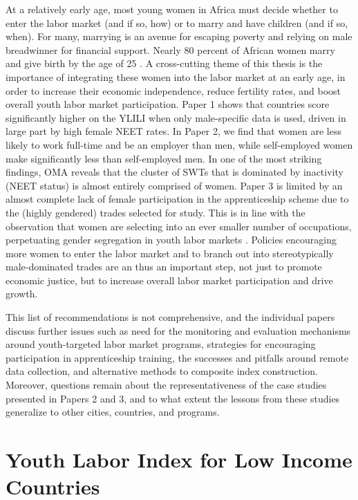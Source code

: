 \documentclass[
  a4paper, twoside, 12pt]{book}
\newcommand{\newsection}{\setcounter{figure}{0}
\renewcommand{\thefigure}{\arabic{chapter}.\arabic{figure}}
\setcounter{table}{0}
\renewcommand{\thetable}{\arabic{chapter}.\arabic{table}}}
\begin{document}
At a relatively early age, most young women in Africa must decide whether to enter the labor market (and if so, how) or to marry and have children (and if so, when). For many, marrying is an avenue for escaping poverty and relying on male breadwinner for financial support. Nearly 80 percent of African women marry and give birth by the age of 25 \autocite{filmer2014}. A cross-cutting theme of this thesis is the importance of integrating these women into the labor market at an early age, in order to increase their economic independence, reduce fertility rates, and boost overall youth labor market participation. Paper 1 shows that countries score significantly higher on the YLILI when only male-specific data is used, driven in large part by high female NEET rates. In Paper 2, we find that women are less likely to work full-time and be an employer than men, while self-employed women make significantly less than self-employed men. In one of the most striking findings, OMA reveals that the cluster of SWTs that is dominated by inactivity (NEET status) is almost entirely comprised of women. Paper 3 is limited by an almost complete lack of female participation in the apprenticeship scheme due to the (highly gendered) trades selected for study. This is in line with the observation that women are selecting into an ever smaller number of occupations, perpetuating gender segregation in youth labor markets \autocite{borrowman2020}. Policies encouraging more women to enter the labor market and to branch out into stereotypically male-dominated trades are an thus an important step, not just to promote economic justice, but to increase overall labor market participation and drive growth.

This list of recommendations is not comprehensive, and the individual papers discuss further issues such as need for the monitoring and evaluation mechanisms around youth-targeted labor market programs, strategies for encouraging participation in apprenticeship training, the successes and pitfalls around remote data collection, and alternative methods to composite index construction. Moreover, questions remain about the representativeness of the case studies presented in Papers 2 and 3, and to what extent the lessons from these studies generalize to other cities, countries, and programs.

\newpage
{}
\printbibliography[segment=\therefsegment,heading=subbibintoc,title={References}]

\newsection

\chapter{Youth Labor Index for Low Income Countries}
\end{document}
